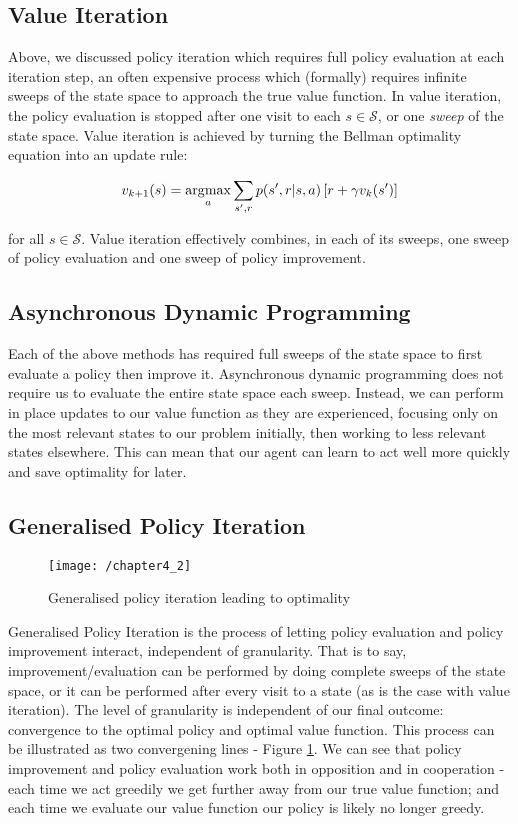 \subsection{Value Iteration}
Above, we discussed policy iteration which requires full policy evaluation at each iteration step, an often expensive process which (formally) requires infinite sweeps of the state space to approach the true value function. In value iteration, the policy evaluation is stopped after one visit to each $s \in \mathcal{S}$, or one \textit{sweep} of the state space. Value iteration is achieved by turning the Bellman optimality equation into an update rule:

\begin{equation}
v_{k+1}(s) = \operatorname*{\arg\!\max}_a \sum_{s',r} p(s', r |s, a)\left[r + \gamma v_k(s')\right]
\end{equation}

for all $s \in \mathcal{S}$. Value iteration effectively combines, in each of its sweeps, one sweep of policy evaluation and one sweep of policy improvement. 

\subsection{Asynchronous Dynamic Programming}
Each of the above methods has required full sweeps of the state space to first evaluate a policy then improve it. Asynchronous dynamic programming does not require us to evaluate the entire state space each sweep. Instead, we can perform in place updates to our value function as they are experienced, focusing only on the most relevant states to our problem initially, then working to less relevant states elsewhere. This can mean that our agent can learn to act well more quickly and save optimality for later.

\subsection{Generalised Policy Iteration}
\begin{figure}[h!]
	\centering
	\texttt{[image: /chapter4\_2]}
	\caption{Generalised policy iteration leading to optimality}
	\label{fig:gpi}
\end{figure}

Generalised Policy Iteration is the process of letting policy evaluation and policy improvement interact, independent of granularity. That is to say, improvement/evaluation can be performed by doing complete sweeps of the state space, or it can be performed after every visit to a state (as is the case with value iteration). The level of granularity is independent of our final outcome: convergence to the optimal policy and optimal value function. This process can be illustrated as two convergening lines - Figure \ref{fig:gpi}. We can see that policy improvement and policy evaluation work both in opposition and in cooperation - each time we act greedily we get further away from our true value function; and each time we evaluate our value function our policy is likely no longer greedy. 

